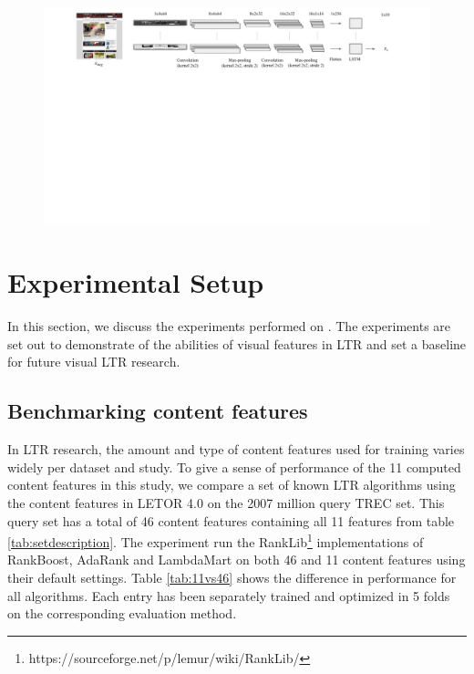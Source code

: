 \begin{figure}[t]
\centering
\includegraphics[clip,trim=0 10cm 0 0, width=20cm]{images/vip-features.pdf}
   \label{fig:ViPfeat} 
\end{figure}

\section{Experimental Setup}\label{sec:experiments}
In this section, we discuss the experiments performed on \datasetname. The experiments are set out to demonstrate of the abilities of visual features in LTR and set a baseline for future visual LTR research.


\subsection{Benchmarking content features}
In LTR research, the amount and type of content features used for training varies widely per dataset and study. To give a sense of performance of the 11 computed content features in this study, we compare a set of known LTR algorithms using the content features in LETOR 4.0 on the 2007 million query TREC set. This query set has a total of 46 content features containing all 11 features from table \ref{tab:setdescription}. The experiment run the RankLib\footnote{https://sourceforge.net/p/lemur/wiki/RankLib/} implementations of RankBoost, AdaRank and LambdaMart on both 46 and 11 content features using their default settings. Table \ref{tab:11vs46} shows the difference in performance for all algorithms. Each entry has been separately trained and optimized in 5 folds on the corresponding evaluation method. 

